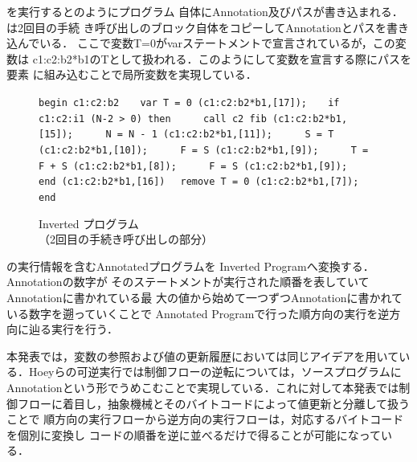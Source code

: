 \documentclass[submit,PRO]{ipsj}
\def\|{\verb|}
\begin{document}
を実行するとのようにプログラム
自体にAnnotation及びパスが書き込まれる．は2回目の手続
き呼び出しのブロック自体をコピーしてAnnotationとパスを書き込んでいる．
ここで変数T=0がvarステートメントで宣言されているが，この変数は
c1:c2:b2*b1のTとして扱われる．このようにして変数を宣言する際にパスを要素
に組み込むことで局所変数を実現している．

%\subsection{Inverted プログラム}
\begin{figure}[tb]
\vbox{
\hbox{\|begin c1:c2:b2|}
\hbox{\|   var T = 0 (c1:c2:b2*b1,[17]);|}
\hbox{\|   if c1:c2:i1 (N-2 > 0) then|}
\hbox{\|     call c2 fib (c1:c2:b2*b1,[15]);|}
\hbox{\|     N = N - 1 (c1:c2:b2*b1,[11]);|}
\hbox{\|     S = T (c1:c2:b2*b1,[10]);|}
\hbox{\|     F = S (c1:c2:b2*b1,[9]);|}
\hbox{\|     T = F + S (c1:c2:b2*b1,[8]);|}
\hbox{\|     F = S (c1:c2:b2*b1,[9]);|}
\hbox{\|  end (c1:c2:b2*b1,[16])|}
\hbox{\|  remove T = 0 (c1:c2:b2*b1,[7]);|}
\hbox{\|end|}
}
\centerline{}
\caption{Inverted プログラム\\
（2回目の手続き呼び出しの部分）}
\label{fig:Hinvprogram}
\end{figure}



の実行情報を含むAnnotatedプログラムを
 Inverted Programへ変換する．Annotationの数字が
そのステートメントが実行された順番を表していてAnnotationに書かれている最
大の値から始めて一つずつAnnotationに書かれている数字を遡っていくことで
Annotated Programで行った順方向の実行を逆方向に辿る実行を行う．

本発表では，変数の参照および値の更新履歴においては同じアイデアを用いてい
る．Hoeyらの可逆実行では制御フローの逆転については，ソースプログラムに
Annotationという形でうめこむことで実現している．これに対して本発表では制
御フローに着目し，抽象機械とそのバイトコードによって値更新と分離して扱うことで
順方向の実行フローから逆方向の実行フローは，対応するバイトコードを個別に変換し
コードの順番を逆に並べるだけで得ることが可能になっている．
\end{document}

